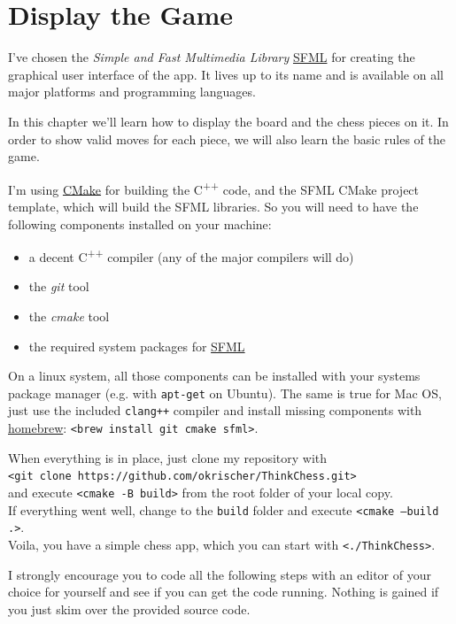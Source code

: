 \chapter{Display the Game}

I've chosen the \emph{Simple and Fast Multimedia Library}
\href{https://www.sfml-dev.org/index.php}{SFML} for creating the graphical user interface
of the app.
It lives up to its name and is available on all major platforms and programming languages.

In this chapter we'll learn how to display the board and the chess pieces on it.
In order to show valid moves for each piece, we will also learn the basic rules of the game.

I'm using \href{https://cmake.org/}{CMake} for building the C\textsuperscript{++} code,
and the SFML CMake project template, which will build the SFML libraries.
So you will need to have the following components installed on your machine:

\begin{itemize}
  \item a decent C\textsuperscript{++} compiler (any of the major compilers will do)
  \item the \emph{git} tool
  \item the \emph{cmake} tool
  \item the required system packages for
    \href{https://www.sfml-dev.org/tutorials/2.6/start-cmake.php}{SFML}
\end{itemize}
 
On a linux system, all those components can be installed with your systems package manager
(e.g. with \texttt{apt-get} on Ubuntu).
The same is true for Mac OS, just use the included \texttt{clang++} compiler and install
missing components with \href{https://brew.sh/}{homebrew}:
\texttt{<brew install git cmake sfml>}.

When everything is in place, just clone my repository with\\
\texttt{<git clone https://github.com/okrischer/ThinkChess.git>}\\
and execute \texttt{<cmake -B build>} from the root folder of your local copy.\\
If everything went well, change to the \texttt{build} folder and execute \texttt{<cmake --build .>}.\\
Voila, you have a simple chess app, which you can start with \texttt{<./ThinkChess>}.

I strongly encourage you to code all the following steps with an editor of your choice
for yourself and see if you can get the code running. Nothing is gained if you just skim
over the provided source code.

